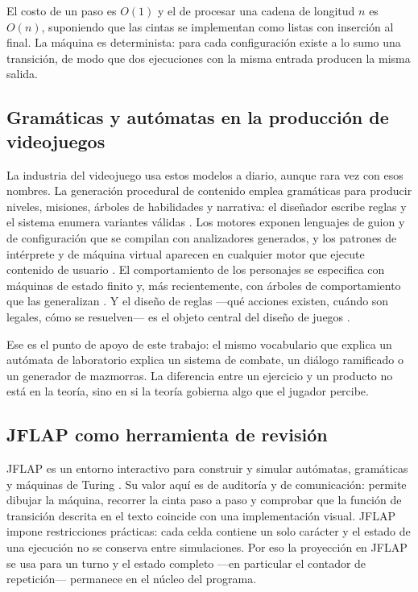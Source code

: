 \documentclass[9pt]{ieeeconf}
\begin{document}
El costo de un paso es $O(1)$ y el de procesar una cadena de longitud $n$ es $O(n)$, suponiendo que las cintas se implementan como listas con inserción al final. La máquina es determinista: para cada configuración existe a lo sumo una transición, de modo que dos ejecuciones con la misma entrada producen la misma salida.

\subsection{Gramáticas y autómatas en la producción de videojuegos}
\label{sec:industria}

La industria del videojuego usa estos modelos a diario, aunque rara vez con esos nombres. La generación procedural de contenido emplea gramáticas para producir niveles, misiones, árboles de habilidades y narrativa: el diseñador escribe reglas y el sistema enumera variantes válidas \cite{shaker2016}. Los motores exponen lenguajes de guion y de configuración que se compilan con analizadores generados, y los patrones de intérprete y de máquina virtual aparecen en cualquier motor que ejecute contenido de usuario \cite{gregory2018,nystrom2014}. El comportamiento de los personajes se especifica con máquinas de estado finito y, más recientemente, con árboles de comportamiento que las generalizan \cite{millington2019}. Y el diseño de reglas ---qué acciones existen, cuándo son legales, cómo se resuelven--- es el objeto central del diseño de juegos \cite{salen2004,schell2019}.

Ese es el punto de apoyo de este trabajo: el mismo vocabulario que explica un autómata de laboratorio explica un sistema de combate, un diálogo ramificado o un generador de mazmorras. La diferencia entre un ejercicio y un producto no está en la teoría, sino en si la teoría gobierna algo que el jugador percibe.

\subsection{JFLAP como herramienta de revisión}
\label{sec:jflap}

JFLAP es un entorno interactivo para construir y simular autómatas, gramáticas y máquinas de Turing \cite{rodger2006}. Su valor aquí es de auditoría y de comunicación: permite dibujar la máquina, recorrer la cinta paso a paso y comprobar que la función de transición descrita en el texto coincide con una implementación visual. JFLAP impone restricciones prácticas: cada celda contiene un solo carácter y el estado de una ejecución no se conserva entre simulaciones. Por eso la proyección en JFLAP se usa para un turno y el estado completo ---en particular el contador de repetición--- permanece en el núcleo del programa.
\end{document}

